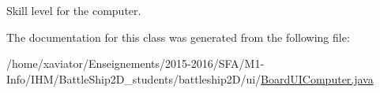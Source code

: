 Skill level for the computer. 



The documentation for this class was generated from the following file\-:\begin{DoxyCompactItemize}
\item 
/home/xaviator/\-Enseignements/2015-\/2016/\-S\-F\-A/\-M1-\/\-Info/\-I\-H\-M/\-Battle\-Ship2\-D\-\_\-students/battleship2\-D/ui/\hyperlink{BoardUIComputer_8java}{Board\-U\-I\-Computer.\-java}\end{DoxyCompactItemize}

